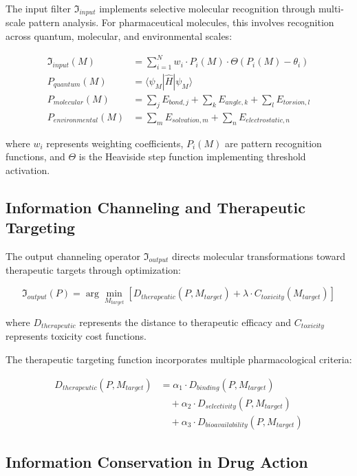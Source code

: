 \documentclass[12pt,a4paper]{article}
\begin{document}
The input filter $\mathfrak{I}_{input}$ implements selective molecular recognition through multi-scale pattern analysis. For pharmaceutical molecules, this involves recognition across quantum, molecular, and environmental scales:

\begin{align}
\mathfrak{I}_{input}(M) &= \sum_{i=1}^{N} w_i \cdot P_i(M) \cdot \Theta(P_i(M) - \theta_i) \\
P_{quantum}(M) &= \langle \psi_M | \hat{H} | \psi_M \rangle \\
P_{molecular}(M) &= \sum_j E_{bond,j} + \sum_k E_{angle,k} + \sum_l E_{torsion,l} \\
P_{environmental}(M) &= \sum_m E_{solvation,m} + \sum_n E_{electrostatic,n}
\end{align}

where $w_i$ represents weighting coefficients, $P_i(M)$ are pattern recognition functions, and $\Theta$ is the Heaviside step function implementing threshold activation.

\subsection{Information Channeling and Therapeutic Targeting}

The output channeling operator $\mathfrak{I}_{output}$ directs molecular transformations toward therapeutic targets through optimization:

\begin{equation}
\mathfrak{I}_{output}(P) = \arg\min_{M_{target}} \left[ D_{therapeutic}(P, M_{target}) + \lambda \cdot C_{toxicity}(M_{target}) \right]
\end{equation}

where $D_{therapeutic}$ represents the distance to therapeutic efficacy and $C_{toxicity}$ represents toxicity cost functions.

The therapeutic targeting function incorporates multiple pharmacological criteria:

\begin{align}
D_{therapeutic}(P, M_{target}) &= \alpha_1 \cdot D_{binding}(P, M_{target}) \\
&\quad + \alpha_2 \cdot D_{selectivity}(P, M_{target}) \\
&\quad + \alpha_3 \cdot D_{bioavailability}(P, M_{target})
\end{align}

\subsection{Information Conservation in Drug Action}
\end{document}
